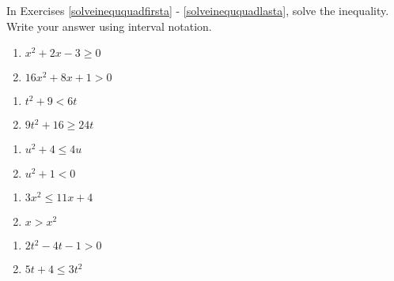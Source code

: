 In Exercises \ref{solveineququadfirsta} - \ref{solveineququadlasta}, solve the inequality.  Write your answer using interval notation.

\begin{multicols}{2}
\begin{enumerate}
\setcounter{enumi}{\value{HW}}

\item $x^{2} + 2x - 3 \geq 0$  \label{solveineququadfirsta}
\item  $16x^2+8x+1 > 0$

\setcounter{HW}{\value{enumi}}
\end{enumerate}
\end{multicols}

\begin{multicols}{2}
\begin{enumerate}
\setcounter{enumi}{\value{HW}}


\item  $t^2+9 < 6t$
\item  $9t^2 + 16 \geq 24t$


\setcounter{HW}{\value{enumi}}
\end{enumerate}
\end{multicols}

\begin{multicols}{2}
\begin{enumerate}
\setcounter{enumi}{\value{HW}}

\item  $u^2+4 \leq 4u$
\item $u^{2} + 1 < 0$


\setcounter{HW}{\value{enumi}}
\end{enumerate}
\end{multicols}

\begin{multicols}{2}
\begin{enumerate}
\setcounter{enumi}{\value{HW}}

\item $3x^{2} \leq 11x + 4$
\item $x > x^{2}$


\setcounter{HW}{\value{enumi}}
\end{enumerate}
\end{multicols}

\begin{multicols}{2}
\begin{enumerate}
\setcounter{enumi}{\value{HW}}

\item  $2t^2-4t-1 > 0$
\item  $5t+4 \leq 3t^2$


\setcounter{HW}{\value{enumi}}
\end{enumerate}
\end{multicols}

